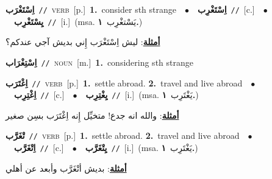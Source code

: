 \documentclass[10pt,a4paper,twoside]{article} %
\begin{document}
\begin{multicols}{2}
{\setlength\topsep{0pt}\textbf{\foreignlanguage{arabic}{اِسْتَغْرَب}}\ {\color{gray}\texttt{//}\color{black}}\ \textsc{verb}\ [p.]\ \textbf{1.}~consider sth strange\ \ $\bullet$\ \ \setlength\topsep{0pt}\textbf{\foreignlanguage{arabic}{اِسْتَغْرِب}}\ {\color{gray}\texttt{//}\color{black}}\ [c.]\ \ $\bullet$\ \ \setlength\topsep{0pt}\textbf{\foreignlanguage{arabic}{يِسْتَغْرِب}}\ {\color{gray}\texttt{//}\color{black}}\ [i.]\ \color{gray}(msa. \foreignlanguage{arabic}{يَسْتغْرِب}~\foreignlanguage{arabic}{\textbf{١.}})\color{black}\  \begin{flushright}\color{gray}\foreignlanguage{arabic}{\textbf{\underline{\foreignlanguage{arabic}{أمثلة}}}: ليش اِسْتَغْرَب إِني بديش آجي عندكم؟}\end{flushright}\color{black}} \vspace{2mm}

{\setlength\topsep{0pt}\textbf{\foreignlanguage{arabic}{اِسْتِغْرَاب}}\ {\color{gray}\texttt{//}\color{black}}\ \textsc{noun}\ [m.]\ \textbf{1.}~considering sth strange\ } \vspace{2mm}

{\setlength\topsep{0pt}\textbf{\foreignlanguage{arabic}{اِغْتَرَب}}\ {\color{gray}\texttt{//}\color{black}}\ \textsc{verb}\ [p.]\ \textbf{1.}~settle abroad.  \textbf{2.}~travel and live abroad\ \ $\bullet$\ \ \setlength\topsep{0pt}\textbf{\foreignlanguage{arabic}{اِغْتِرِب}}\ {\color{gray}\texttt{//}\color{black}}\ [c.]\ \ $\bullet$\ \ \setlength\topsep{0pt}\textbf{\foreignlanguage{arabic}{يِغْتِرِب}}\ {\color{gray}\texttt{//}\color{black}}\ [i.]\ \color{gray}(msa. \foreignlanguage{arabic}{يَغْتَرِب}~\foreignlanguage{arabic}{\textbf{١.}})\color{black}\  \begin{flushright}\color{gray}\foreignlanguage{arabic}{\textbf{\underline{\foreignlanguage{arabic}{أمثلة}}}: والله انه جدع! متخيِّل إِنه اِغْتَرَب بسِن صغير}\end{flushright}\color{black}} \vspace{2mm}

{\setlength\topsep{0pt}\textbf{\foreignlanguage{arabic}{تْغَرَّب}}\ {\color{gray}\texttt{//}\color{black}}\ \textsc{verb}\ [p.]\ \textbf{1.}~settle abroad.  \textbf{2.}~travel and live abroad\ \ $\bullet$\ \ \setlength\topsep{0pt}\textbf{\foreignlanguage{arabic}{اِتْغَرَّب}}\ {\color{gray}\texttt{//}\color{black}}\ [c.]\ \ $\bullet$\ \ \setlength\topsep{0pt}\textbf{\foreignlanguage{arabic}{يِتْغَرَّب}}\ {\color{gray}\texttt{//}\color{black}}\ [i.]\ \color{gray}(msa. \foreignlanguage{arabic}{يَغْتَرِب}~\foreignlanguage{arabic}{\textbf{١.}})\color{black}\  \begin{flushright}\color{gray}\foreignlanguage{arabic}{\textbf{\underline{\foreignlanguage{arabic}{أمثلة}}}: بديش أتْغَرَّب وأبعد عن أهلي}\end{flushright}\color{black}} \vspace{2mm}


\end{multicols}
\end{document}
